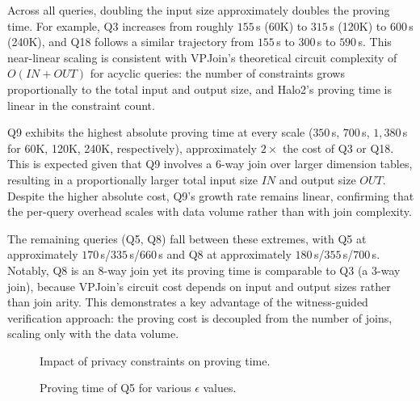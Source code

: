 \documentclass[sigconf]{acmart}
\begin{document}
Across all queries, doubling the input size approximately doubles the proving time. For example, Q3 increases from roughly $155$\,s (60K) to $315$\,s (120K) to $600$\,s (240K), and Q18 follows a similar trajectory from $155$\,s to $300$\,s to $590$\,s. This near-linear scaling is consistent with VPJoin's theoretical circuit complexity of $O(\mathit{IN} + \mathit{OUT})$ for acyclic queries: the number of constraints grows proportionally to the total input and output size, and Halo2's proving time is linear in the constraint count.

Q9 exhibits the highest absolute proving time at every scale ($350$\,s, $700$\,s, $1{,}380$\,s for 60K, 120K, 240K, respectively), approximately $2\times$ the cost of Q3 or Q18. This is expected given that Q9 involves a $6$-way join over larger dimension tables, resulting in a proportionally larger total input size $\mathit{IN}$ and output size $\mathit{OUT}$. Despite the higher absolute cost, Q9's growth rate remains linear, confirming that the per-query overhead scales with data volume rather than with join complexity.

The remaining queries (Q5, Q8) fall between these extremes, with Q5 at approximately $170$\,s/$335$\,s/$660$\,s and Q8 at approximately $180$\,s/$355$\,s/$700$\,s. Notably, Q8 is an $8$-way join yet its proving time is comparable to Q3 (a $3$-way join), because VPJoin's circuit cost depends on input and output sizes rather than join arity. This demonstrates a key advantage of the witness-guided verification approach: the proving cost is decoupled from the number of joins, scaling only with the data volume.




\begin{figure}
\centerline{ }
\captionsetup{skip=2pt} 
\caption{Impact of privacy constraints on proving time.}
\label{fig:privacy}
\vspace{-0.2in}
\end{figure}

\begin{figure}
\centerline{ }
\captionsetup{skip=2pt} 
\caption{Proving time of Q5 for various $\epsilon$ values.}
\label{fig:q5_privacy}
\vspace{-0.2in}
\end{figure}
\end{document}
